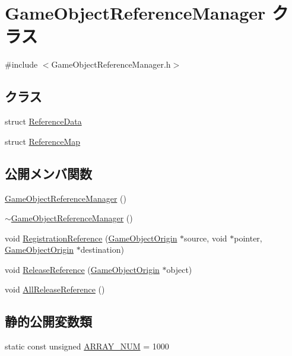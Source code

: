 \hypertarget{class_game_object_reference_manager}{}\section{Game\+Object\+Reference\+Manager クラス}
\label{class_game_object_reference_manager}


{\ttfamily \#include $<$Game\+Object\+Reference\+Manager.\+h$>$}

\subsection*{クラス}
\begin{DoxyCompactItemize}
\item 
struct \mbox{\hyperlink{struct_game_object_reference_manager_1_1_reference_data}{Reference\+Data}}
\item 
struct \mbox{\hyperlink{struct_game_object_reference_manager_1_1_reference_map}{Reference\+Map}}
\end{DoxyCompactItemize}
\subsection*{公開メンバ関数}
\begin{DoxyCompactItemize}
\item 
\mbox{\hyperlink{class_game_object_reference_manager_aed165af9f1a16894c65f974945020cda}{Game\+Object\+Reference\+Manager}} ()
\item 
\mbox{\hyperlink{class_game_object_reference_manager_a9ed62220afb840cdc3e8cbe4bbc3a19e}{$\sim$\+Game\+Object\+Reference\+Manager}} ()
\item 
void \mbox{\hyperlink{class_game_object_reference_manager_ac8e7ea130fc9b3645f95d7db5d4ad667}{Registration\+Reference}} (\mbox{\hyperlink{class_game_object_origin}{Game\+Object\+Origin}} $\ast$source, void $\ast$pointer, \mbox{\hyperlink{class_game_object_origin}{Game\+Object\+Origin}} $\ast$destination)
\item 
void \mbox{\hyperlink{class_game_object_reference_manager_a34f9974bf2d2930ee10f7a3a7f6c51d5}{Release\+Reference}} (\mbox{\hyperlink{class_game_object_origin}{Game\+Object\+Origin}} $\ast$object)
\item 
void \mbox{\hyperlink{class_game_object_reference_manager_ac4852ddd6d8bd5e1f13284ba6204e221}{All\+Release\+Reference}} ()
\end{DoxyCompactItemize}
\subsection*{静的公開変数類}
\begin{DoxyCompactItemize}
\item 
static const unsigned \mbox{\hyperlink{class_game_object_reference_manager_a962d30b10c5b76353645773b2c1740ce}{A\+R\+R\+A\+Y\+\_\+\+N\+UM}} = 1000
\end{DoxyCompactItemize}


